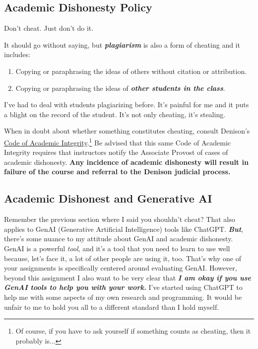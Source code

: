 \documentclass[11pt,]{article}
\providecommand{\tightlist}{%
  \setlength{\itemsep}{0pt}\setlength{\parskip}{0pt}}
\begin{document}
\hypertarget{academic-dishonesty-policy}{%
\subsection{Academic Dishonesty
Policy}\label{academic-dishonesty-policy}}

Don't cheat. Just don't do it.

It should go without saying, but \textbf{\emph{plagiarism}} is also a
form of cheating and it includes:

\begin{enumerate}
\def\labelenumi{\arabic{enumi}.}
\tightlist
\item
  Copying or paraphrasing the ideas of others without citation or
  attribution.
\item
  Copying or paraphrasing the ideas of \textbf{\emph{other students in
  the class}}.
\end{enumerate}

I've had to deal with students plagiarizing before. It's painful for me
and it puts a blight on the record of the student. It's not only
cheating, it's stealing.

When in doubt about whether something constitutes cheating, consult
Denison's \href{https://denison.edu/academics/curriculum/integrity}{Code
of Academic
Integrity}.\footnote{Of course, if you have to ask yourself if something counts as cheating, then it probably is...}
Be advised that this same Code of Academic Integrity requires that
instructors notify the Associate Provost of cases of academic
dishonesty. \textbf{Any incidence of academic dishonesty will result in
failure of the course and referral to the Denison judicial process.}

\hypertarget{academic-dishonest-and-generative-ai}{%
\subsection{Academic Dishonest and Generative
AI}\label{academic-dishonest-and-generative-ai}}

Remember the previous section where I said you shouldn't cheat? That
also applies to GenAI (Generative Artificial Intelligence) tools like
ChatGPT. \textbf{\emph{But}}, there's some nuance to my attitude about
GenAI and academic dishonesty. GenAI is a powerful \emph{tool}, and it's
a tool that you need to learn to use well because, let's face it, a lot
of other people are using it, too. That's why one of your assignments is
specifically centered around evaluating GenAI. However, beyond this
assignment I also want to be very clear that \textbf{\emph{I am okay if
you use GenAI tools to help you with your work.}} I've started using
ChatGPT to help me with some aspects of my own research and programming.
It would be unfair to me to hold you all to a different standard than I
hold myself.
\end{document}
